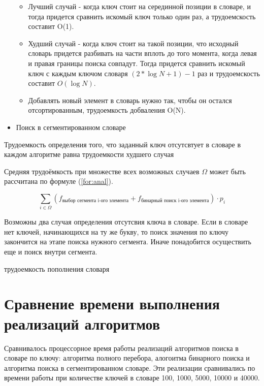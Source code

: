 \begin{itemize}
\begin{itemize}
	\item Лучший случай - когда ключ стоит на серединной позиции в словаре, и тогда придется сравнить искомый ключ только один раз, а трудоемскость составит O(1).
	
	\item Худший случай - когда ключ стоит на такой позиции, что исходный словарь придется разбивать на части вплоть до того момента, когда левая и правая границы поиска совпадут. Тогда придется сравнить искомый ключ с каждым ключом словаря $(2*\log{N+1}) - 1$ раз и трудоемскость составит $O(\log{N})$.
	
	\item Добавлять новый элемент в словарь нужно так, чтобы он остался отсортированным, трудоемкость добваления O(N).
	
	\end{itemize}


	\item Поиск в сегментированном словаре

\end{itemize}

Трудоемкость определения того, что заданный ключ отсутсвтует в словаре в каждом алгоритме равна трудоемкости худшего случая


Средняя трудоёмкость при множестве всех возможных случаев $\Omega$ может быть рассчитана по формуле (\ref{for:anal}). 

\begin{equation}
	\label{for:anal}
	\sum_{i \in \Omega}{\left(f_{\text{выбор сегмента i-ого элемента}} + f_{\text{бинарный поиск i-ого элемента}}\right)} \cdot p_i
\end{equation}

Возможны два случая определения отсутсвия ключа в словаре. Если в словаре нет ключей, начинающихся на ту же букву, то поиск значения по ключу закончится на этапе поиска нужного сегмента. Иначе понадобится осуществить еще и поиск внутри сегмента.

трудоемкость пополнения словаря


\section{Сравнение времени выполнения реализаций алгоритмов}

Сравнивалось процессорное время работы реализаций алгоритмов поиска в словаре по ключу: алгоритма полного перебора, алогоитма бинарного поиска и алгоритма поиска в сегментированном словаре. Эти реализации сравнивались по времени работы при количестве ключей в словаре 100, 1000, 5000, 10000 и 40000.

